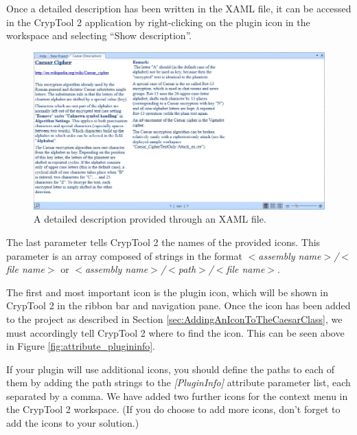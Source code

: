 Once a detailed description has been written in the XAML file, it can be accessed in the CrypTool 2 application by right-clicking on the plugin icon in the workspace and selecting ``Show description''.

\begin{figure}[h!]
	\centering
		\includegraphics[width=1.00\textwidth]{figures/xaml_description.jpg}
	\caption{A detailed description provided through an XAML file.}
	\label{fig:xaml_description}
\end{figure}
\clearpage

The last parameter tells CrypTool 2 the names of the provided icons. This parameter is an array composed of strings in the format \textit{$<$assembly name$>$/$<$file name$>$} or \textit{$<$assembly name$>$/$<$path$>$/$<$file name$>$}.

The first and most important icon is the plugin icon, which will be shown in CrypTool 2 in the ribbon bar and navigation pane. Once the icon has been added to the project as described in Section \ref{sec:AddingAnIconToTheCaesarClass}, we must accordingly tell CrypTool 2 where to find the icon. This can be seen above in Figure \ref{fig:attribute_plugininfo}.


If your plugin will use additional icons, you should define the paths to each of them by adding the path strings to the \textit{[PluginInfo]} attribute parameter list, each separated by a comma. We have added two further icons for the context menu in the CrypTool 2 workspace. (If you do choose to add more icons, don't forget to add the icons to your solution.)

